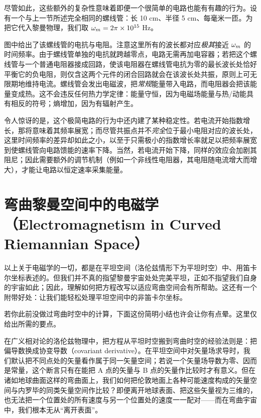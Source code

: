 
尽管如此，这些额外的复杂性意味着即便一个很简单的电路也能有有趣的行为。设有一个与上一节所述完全相同的螺线管：长 10 cm、半径 5 cm、每毫米一匝。为把它代入黎曼物理，我们取 $\omega_m=2\pi\times10^{15}$ Hz。

图中给出了该螺线管的电抗与电阻。注意这里所有的波长都对应\emph{极其}接近 $\omega_m$ 的时间频率。由于螺线管单独的电抗就跨越零点，电路无需再加电容器；若把这个螺线管与一个普通电阻器接成回路，使该电阻器在螺线管电抗为零的最长波长处恰好平衡它的负电阻，则仅含这两个元件的闭合回路就会在该波长处共振，原则上可无限期地维持电流。螺线管会发出电磁波，把\emph{常规}能量带入电路，而电阻器会把该能量变成热。这不会违反任何热力学定律：能量守恒，因为电磁场能量与热/动能具有相反的符号；熵增加，因为有辐射产生。

令人惊讶的是，这个极简电路的行为中还内建了某种稳定性。若电流开始指数增长，那将意味着其频率展宽；而尽管共振点并不\emph{完全}位于最小电阻对应的波长处，这里时间频率的差异却如此之小，以至于只需极小的指数增长率就足以把频率展宽到使螺线管向电路馈能的速率下降。当然，若电流开始下降，同样的效应会加剧其阻尼；因此需要额外的调节机制（例如一个非线性电阻器，其电阻随电流增大而增大），才能让电路以恒定速率采集能量。

\section{弯曲黎曼空间中的电磁学（Electromagnetism in Curved Riemannian Space）}

以上关于电磁学的一切，都是在平坦空间（洛伦兹情形下为平坦时空）中、用笛卡尔坐标表述的。但我们并不真的指望黎曼宇宙处处完美平坦，正如不指望我们自身的宇宙如此；因此，理解如何把方程改写以适应弯曲空间会有所帮助。这还有一个附带好处：让我们能轻松处理平坦空间中的非笛卡尔坐标。

若你此前没做过弯曲时空中的计算，下面这份简明小结也许会让你有点晕。这里仅给出所需的要点。

在广义相对论的洛伦兹物理中，把方程从平坦时空搬到弯曲时空的经验法则是：把偏导数换成协变导数（covariant derivative）。在平坦空间中对矢量场求导时，我们默认把不同点处的矢量看作属于同一矢量空间；若说一个矢量场导数为零、因而是常量，这个断言只有在能把 A 点的矢量与 B 点的矢量作比较时才有意义。但在诸如地球曲面这样的弯曲面上，我们如何把伦敦地面上各种可能速度构成的矢量空间与内罗毕的同类矢量空间作比较？即便离开地球表面、把这些矢量视为三维的，也无法把一个位置处的所有速度与另一个位置处的速度一一配对——而在弯曲宇宙中，我们根本无从“离开表面”。


